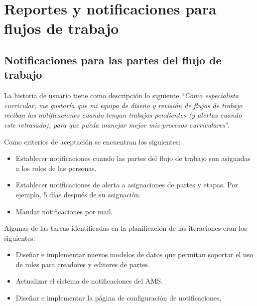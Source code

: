 \section{Reportes y notificaciones para flujos de trabajo}
\begin{table}[H]
\centering
\caption{Historias de usuario para los reportes y notificaciones de versiones de cursos}
\label{epic:9}
\end{table}

\subsection{Notificaciones para las partes del flujo de trabajo}
La historia de usuario tiene como descripción lo siguiente \enquote{\textit{Como especialista curricular, me gustaría que mi equipo de diseño y revisión de flujos de trabajo reciban las notificaciones cuando tengan trabajos pendientes (y alertas cuando este retrasado), para que pueda manejar mejor mis procesos curriculares}}.

Como criterios de aceptación se encuentran los siguientes:
\begin{itemize}
	\item Establecer notificaciones cuando las partes del flujo de trabajo son asignadas a los roles de las personas.
	\item Establecer notificaciones de alerta a asignaciones de partes y etapas. Por ejemplo, 5 días después de su asignación.
	\item Mandar notificaciones por mail.
\end{itemize}

Algunas de las tareas identificadas en la planificación de las iteraciones eran los siguientes:
\begin{itemize}
	\item Diseñar e implementar nuevos modelos de datos que permitan soportar el uso de roles para creadores y editores de partes.
	\item Actualizar el sistema de notificaciones del AMS.
	\item Diseñar e implementar la página de configuración de notificaciones.
\end{itemize}

